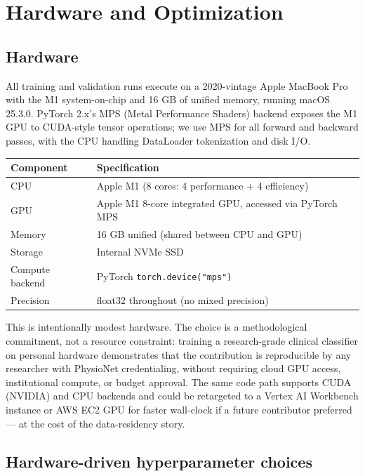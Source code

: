\section{Hardware and Optimization}\label{hardware-and-optimization}

\subsection{Hardware}\label{hardware}

All training and validation runs execute on a 2020-vintage Apple
MacBook Pro with the M1 system-on-chip and 16 GB of unified memory,
running macOS 25.3.0. PyTorch 2.x's MPS (Metal Performance Shaders)
backend exposes the M1 GPU to CUDA-style tensor operations; we use
MPS for all forward and backward passes, with the CPU handling
DataLoader tokenization and disk I/O.

\begin{longtable}[]{@{}ll@{}}
\toprule()
Component & Specification \\
\midrule()
\endhead
CPU & Apple M1 (8 cores: 4 performance + 4 efficiency) \\
GPU & Apple M1 8-core integrated GPU, accessed via PyTorch MPS \\
Memory & 16 GB unified (shared between CPU and GPU) \\
Storage & Internal NVMe SSD \\
Compute backend & PyTorch \texttt{torch.device("mps")} \\
Precision & float32 throughout (no mixed precision) \\
\bottomrule()
\end{longtable}

This is intentionally modest hardware. The choice is a methodological
commitment, not a resource constraint: training a research-grade
clinical classifier on personal hardware demonstrates that the
contribution is reproducible by any researcher with PhysioNet
credentialing, without requiring cloud GPU access, institutional
compute, or budget approval. The same code path supports CUDA
(NVIDIA) and CPU backends and could be retargeted to a Vertex AI
Workbench instance or AWS EC2 GPU for faster wall-clock if a future
contributor preferred --- at the cost of the data-residency story.

\subsection{Hardware-driven hyperparameter choices}\label{hardware-driven-hyperparameter-choices}

